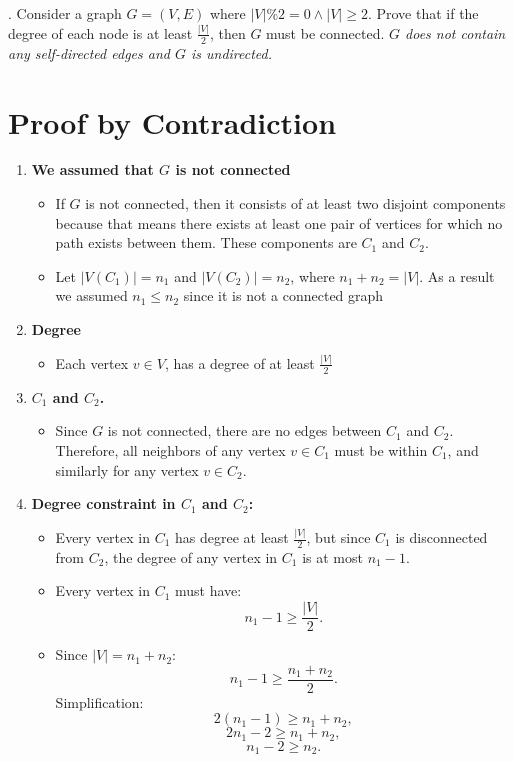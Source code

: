 \documentclass[12pt]{article}
\newcounter{quesnum}
\newcommand{\question}[2][??]{
\begin{list}{\labelitemi}{\leftmargin=2em}
\item [\arabic{quesnum}.] {} {#2}
\end{list}
\addtocounter{quesnum}{1}
}
\begin{document}
\vspace{12pt}


\question[3]{
Consider a graph $G=(V,E)$ where $|V| \% 2 = 0 \wedge |V| \geq 2$. Prove that if the degree of each node is at least $\frac{|V|}{2}$, then $G$ must be connected. \emph{$G$ does not contain any self-directed edges and $G$ is undirected.}
}

\vspace{12pt}

\section*{Proof by Contradiction}

\begin{enumerate}
    \item \textbf{We assumed that $G$ is not connected}
    \begin{itemize}
        \item If $G$ is not connected, then it consists of at least two disjoint components because that means there exists at least one pair of vertices for which no path exists between them. These components are $C_1$ and $C_2$.
        \item Let $|V(C_1)| = n_1$ and $|V(C_2)| = n_2$, where $n_1 + n_2 = |V|$. As a result we assumed $n_1 \leq n_2$ since it is not a connected graph
    \end{itemize}
    
    \item \textbf{Degree}
    \begin{itemize}
\item Each vertex $v \in V$, has a degree of at least $\frac{|V|}{2}$
    \end{itemize}
    
    \item \textbf{$C_1$ and $C_2$.}
    \begin{itemize}
        \item Since $G$ is not connected, there are no edges between $C_1$ and $C_2$. Therefore, all neighbors of any vertex $v \in C_1$ must be within $C_1$, and similarly for any vertex $v \in C_2$.
    \end{itemize}
    
    \item \textbf{Degree constraint in $C_1$ and $C_2$:}
    \begin{itemize}
        \item Every vertex in $C_1$ has degree at least $\frac{|V|}{2}$, but since $C_1$ is disconnected from $C_2$, the degree of any vertex in $C_1$ is at most $n_1 - 1$.
        \item Every vertex in $C_1$ must have:
        \[
        n_1 - 1 \geq \frac{|V|}{2}.
        \]
        \item Since $|V| = n_1 + n_2$:
        \[
        n_1 - 1 \geq \frac{n_1 + n_2}{2}.
        \]
        Simplification:
        \[
        2(n_1 - 1) \geq n_1 + n_2,
        \]
        \[
        2n_1 - 2 \geq n_1 + n_2,
        \]
        \[
        n_1 - 2 \geq n_2.
        \]
    \end{itemize}
    

\end{enumerate}
\end{document}
